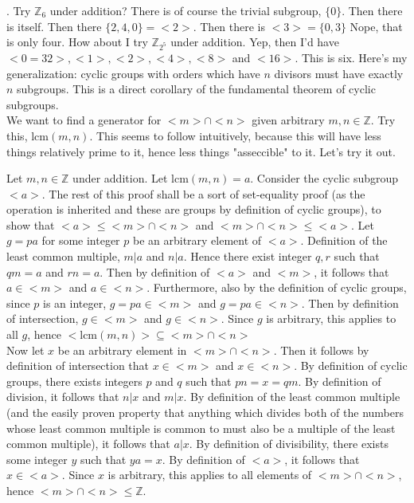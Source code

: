 \documentclass{article}
\newcommand{\lcm}{\mbox{lcm}}
\newcommand{\Z}{\mathbb{Z}}
\begin{document}
. Try $\Z_6$ under addition? There is of course the trivial subgroup, $\{0\}$. Then there is itself. Then there $\{2,4,0\} = <2>$. Then there is $<3> = \{0,3\}$ Nope, that is only four. How about I try $\Z_{2^5}$ under addition. Yep, then I'd have $<0 = 32>, <1>,<2>,<4>,<8>$ and $<16>.$ This is six. Here's my generalization: cyclic groups with orders which have $n$ divisors must have exactly $n$ subgroups. This is a direct corollary of the fundamental theorem of cyclic subgroups.\\
\newpage
{} We want to find a generator for $<m>\cap<n>$ given arbitrary $m,n\in \Z$. Try this, $\lcm(m,n).$ This seems to follow intuitively, because this will have less things relatively prime to it, hence less things "asseccible" to it. Let's try it out.

 Let $m,n\in \Z$ under addition. Let $\lcm(m,n) = a$. Consider the cyclic subgroup $<a>$. The rest of this proof shall be a sort of set-equality proof (as the operation is inherited and these are groups by definition of cyclic groups), to show that $<a> \le <m>\cap<n>$ and $<m>\cap<n>\le <a>$. Let $g = pa$ for some integer $p$ be an arbitrary element of $<a>$. Definition of the least common multiple, $m|a$ and $n|a$. Hence there exist integer $q,r$ such that $qm = a$ and $rn = a$. Then by definition of $<a>$ and $<m>$, it follows that $a\in <m>$ and $a\in <n>$. Furthermore, also by the definition of cyclic groups, since $p$ is an integer, $g = pa\in <m>$ and $g = pa \in <n>$. Then by definition of intersection, $g\in <m>$ and $g\in <n>$. Since $g$ is arbitrary, this applies to all $g$, hence $<\lcm(m,n)>\subseteq <m>\cap<n>$\\

Now let $x$ be an arbitrary element in $<m>\cap <n>$. Then it follows by definition of intersection that $x\in <m>$ and $x\in <n>$. By definition of cyclic groups, there exists integers $p$ and $q$ such that $pn = x = qm$. By definition of division, it follows that $n|x$ and $m|x$. By definition of the least common multiple (and the easily proven property that anything which divides both of the numbers whose least common multiple is common to must also be a multiple of the least common multiple), it follows that $a|x$. By definition of divisibility, there exists some integer $y$ such that $ya = x$. By definition of $<a>$, it follows that $x\in <a>$. Since $x$ is arbitrary, this applies to all elements of $<m>\cap<n>$, hence $<m>\cap<n>\le \Z$.
\end{document}
